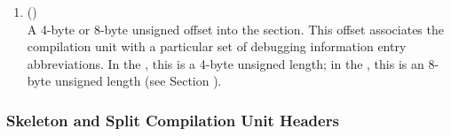 \begin{enumerate}[1. ]
\item \HFNdebugabbrevoffset{} () \\
A 
4-byte or 8-byte unsigned offset into the 
\dotdebugabbrev{}
section. This offset associates the compilation unit with a
particular set of debugging information entry abbreviations. In
the \thirtytwobitdwarfformat, this is a 4-byte unsigned length;
in the \sixtyfourbitdwarfformat, this is an 8-byte unsigned length
(see Section ).

\bbpareb
\end{enumerate}

\subsubsection{Skeleton and Split Compilation Unit Headers}
\label{datarep:skeletonandfullcompilationunitheaders}
